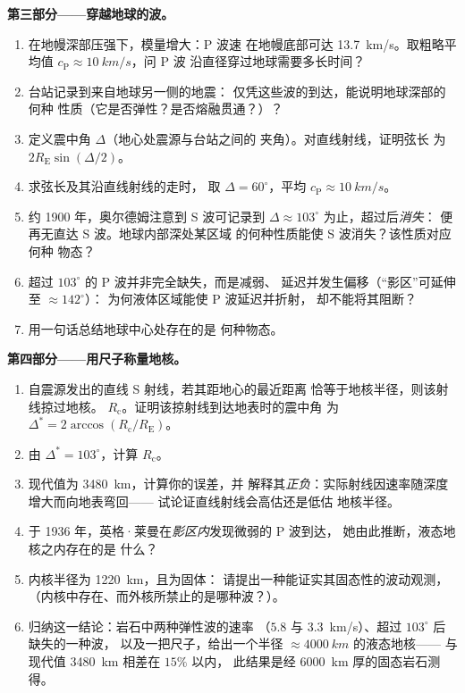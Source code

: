 \begin{problem}
\medskip\noindent\textbf{第三部分——穿越地球的波。}
\begin{enumerate}[resume]
  \item 在地幔深部压强下，模量增大：P 波速
        在地幔底部可达 \qty{13.7}{km/s}。取粗略平均值
        $c_{\text{P}} \approx \qty{10}{km/s}$，问 P 波
        沿直径穿过地球需要多长时间？
  \item 台站记录到来自地球另一侧的地震：
        仅凭这些波的到达，能说明地球深部的何种
        性质（它是否弹性？是否熔融贯通？）？
  \item 定义震中角 $\Delta$（地心处震源与台站之间的
        夹角）。对直线射线，证明弦长
        为 $2R_{\text{E}}\sin(\Delta/2)$。
  \item 求弦长及其沿直线射线的走时，
        取 $\Delta = 60^\circ$，平均 $c_{\text{P}} \approx
        \qty{10}{km/s}$。
  \item 约 1900 年，奥尔德姆注意到 S 波可记录到
        $\Delta \approx 103^\circ$ 为止，超过后\emph{消失}：
        便再无直达 S 波。地球内部深处某区域
        的何种性质能使 S 波消失？该性质对应何种
        物态？
  \item 超过 $103^\circ$ 的 P 波并非完全缺失，而是减弱、
        延迟并发生偏移（“影区”可延伸至 $\approx 142^\circ$）：
        为何液体区域能使 P 波延迟并折射，
        却不能将其阻断？
  \item 用一句话总结地球中心处存在的是
        何种物态。
\end{enumerate}

\medskip\noindent\textbf{第四部分——用尺子称量地核。}
\begin{enumerate}[resume]
  \item 自震源发出的直线 S 射线，若其距地心的最近距离
        恰等于地核半径，则该射线掠过地核。
        $R_{\text{c}}$。证明该掠射线到达地表时的震中角
        为 $\Delta^* =
        2\arccos(R_{\text{c}}/R_{\text{E}})$。
  \item 由 $\Delta^* = 103^\circ$，计算 $R_{\text{c}}$。
  \item 现代值为 \qty{3480}{km}，计算你的误差，并
        解释其\emph{正负}：实际射线因速率随深度增大而向地表弯回——
        试论证直线射线会高估还是低估
        地核半径。
  \item 于 1936 年，英格·莱曼在\emph{影区内}发现微弱的 P 波到达，
        她由此推断，液态地核之内存在的是
        什么？
  \item 内核半径为 \qty{1220}{km}，且为固体：
        请提出一种能证实其固态性的波动观测，
        （内核中存在、而外核所禁止的是哪种波？）。
  \item 归纳这一结论：岩石中两种弹性波的速率
        （$5.8$ 与 \qty{3.3}{km/s}）、超过 $103^\circ$ 后缺失的一种波，
        以及一把尺子，给出一个半径
        $\approx \qty{4000}{km}$ 的液态地核——
        与现代值 \qty{3480}{km} 相差在 $15\%$ 以内，
        此结果是经 \qty{6000}{km} 厚的固态岩石测得。
\end{enumerate}
\end{problem}

